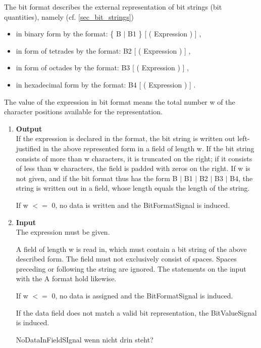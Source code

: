

The bit format describes the external representation of bit strings (bit
quantities), namely (cf. \ref{sec_bit_strings})
\begin{itemize}
\item in binary form by the format: \{ B $\mid$ B1 \} [ ( Expression ) ] ,
\item in form of tetrades by the format: B2 [ ( Expression ) ] ,
\item in form of octades by the format: B3 [ ( Expression ) ] ,
\item in hexadecimal form by the format: B4 [ ( Expression ) ] .
\end{itemize}

The value of the expression in bit format means the total number w of
the character positions available for the representation.
\begin{enumerate}
\item {\bf Output}\\
If the expression is declared in the format, the bit string is written
out left-justified in the above represented form in a field of length
w. If the bit string consists of more than w characters, it is truncated
on the right; if it consists of less than w characters, the field is
padded with zeros on the right. If w is not given, and if the bit format
thus has the form B $\mid$ B1 $\mid$ B2 $\mid$ B3 $\mid$ B4, the string
is written out in a field, whose length equals the length of the
string.

If w $<=$ 0, no data is written and the BitFormatSignal is induced.

\item {\bf Input}\\
The expression must be given.

A field of length w is read in, which must contain a bit string of the
above described form. The field must not exclusively consist of spaces.
Spaces preceding or following the string are ignored. The statements on
the input with the A format hold likewise.

If w $<=$ 0, no data is assigned and the BitFormatSignal is induced.

If the data field does not match a valid bit representation, the
BitValueSignal is induced.

\begin{discuss}
NoDataInFieldSIgnal wenn nicht drin steht?

\end{discuss}
\end{enumerate}


